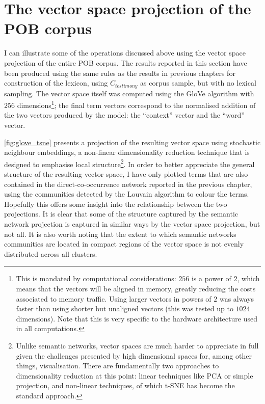 \section{The vector space projection of the POB corpus}

I can illustrate some of the operations discussed above using the vector space projection of the entire POB corpus.
The results reported in this section have been produced using the same rules as the results in previous chapters for construction of the lexicon, using $C_{testimony}$ as corpus sample, but with no lexical sampling.
The vector space itself was computed using the GloVe algorithm with $256$ dimensions\footnote{
    This is mandated by computational considerations: $256$ is a power of $2$, which means that the vectors will be aligned in memory, greatly reducing the costs associated to memory traffic.
    Using larger vectors in powers of $2$ was always faster than using shorter but unaligned vectors (this was tested up to $1024$ dimensions).
    Note that this is very specific to the hardware architecture used in all computations.
}; the final term vectors correspond to the normalised addition of the two vectors produced by the model: the ``context'' vector and the ``word'' vector.

\autoref{fig:glove_tsne} presents a projection of the resulting vector space using stochastic neighbour embeddings, a non-linear dimensionality reduction technique that is designed to emphasise local structure\footnote{
    Unlike semantic networks, vector spaces are much harder to appreciate in full given the challenges presented by high dimensional spaces for, among other things, visualisation.
    There are fundamentally two approaches to dimensionality reduction at this point: linear techniques like PCA or simple projection, and non-linear techniques, of which t-SNE has become the standard approach.
}.
In order to better appreciate the general structure of the resulting vector space, I have only plotted terms that are also contained in the direct-co-occurrence network reported in the previous chapter, using the communities detected by the Louvain algorithm to colour the terms.
Hopefully this offers some insight into the relationship between the two projections.
It is clear that some of the structure captured by the semantic network projection is captured in similar ways by the vector space projection, but not all.
It is also worth noting that the extent to which semantic networks communities are located in compact regions of the vector space is not evenly distributed across all clusters.

